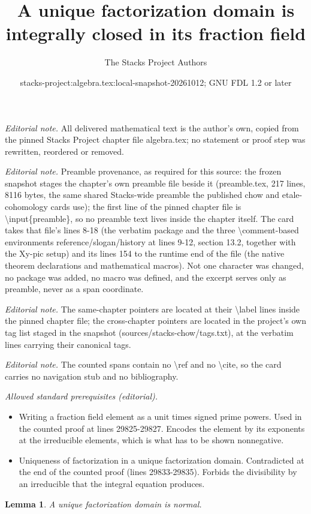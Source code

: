 \documentclass[10pt,a4paper]{amsart}
\title{A unique factorization domain is integrally closed in its fraction field}
\author{The Stacks Project Authors}
\date{stacks-project:algebra.tex:local-snapshot-20261012; GNU FDL 1.2 or later}
\theoremstyle{plain}
\newtheorem{lemma}[subsection]{Lemma}
\theoremstyle{definition}
\theoremstyle{remark}
\numberwithin{equation}{subsection}
\begin{document}
\maketitle
\noindent\textit{Editorial note.} All delivered mathematical text is the author's own, copied from the pinned Stacks Project chapter file algebra.tex; no statement or proof step was rewritten, reordered or removed.\par\medskip
\noindent\textit{Editorial note.} Preamble provenance, as required for this source: the frozen snapshot stages the chapter's own preamble file beside it (preamble.tex, 217 lines, 8116 bytes, the same shared Stacks-wide preamble the published chow and etale-cohomology cards use); the first line of the pinned chapter file is \textbackslash{}input\{preamble\}, so no preamble text lives inside the chapter itself. The card takes that file's lines 8-18 (the verbatim package and the three \textbackslash{}comment-based environments reference/slogan/history at lines 9-12, section 13.2, together with the Xy-pic setup) and its lines 154 to the runtime end of the file (the native theorem declarations and mathematical macros). Not one character was changed, no package was added, no macro was defined, and the excerpt serves only as preamble, never as a span coordinate.\par\medskip
\noindent\textit{Editorial note.} The same-chapter pointers are located at their \textbackslash{}label lines inside the pinned chapter file; the cross-chapter pointers are located in the project's own tag list staged in the snapshot (sources/stacks-chow/tags.txt), at the verbatim lines carrying their canonical tags.\par\medskip
\noindent\textit{Editorial note.} The counted spans contain no \textbackslash{}ref and no \textbackslash{}cite, so the card carries no navigation stub and no bibliography.\par\medskip
\noindent\textit{Allowed standard prerequisites (editorial).}\begin{itemize}
\item Writing a fraction field element as a unit times signed prime powers. Used in the counted proof at lines 29825-29827. Encodes the element by its exponents at the irreducible elements, which is what has to be shown nonnegative.
\item Uniqueness of factorization in a unique factorization domain. Contradicted at the end of the counted proof (lines 29833-29835). Forbids the divisibility by an irreducible that the integral equation produces.
\end{itemize}\medskip
\begin{lemma}
\label{lemma-UFD-normal}
A unique factorization domain is normal.
\end{lemma}
\end{document}
